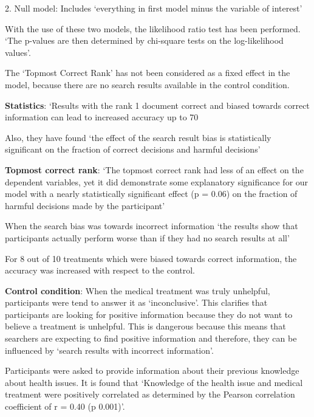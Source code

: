 \documentclass[]{article}
\begin{document}
2.	Null model: Includes ‘everything in first model minus the variable of interest’

With the use of these two models, the likelihood ratio test has been performed. ‘The p-values are then determined by chi-square tests on the log-likelihood values’.

The ‘Topmost Correct Rank’ has not been considered as a fixed effect in the model, because there are no search results available in the control condition. 

\textbf{Statistics}: ‘Results with the rank 1 document correct and biased towards correct information can lead to increased accuracy up to 70%

Also, they have found ‘the effect of the search result bias is statistically significant on the fraction of correct decisions and harmful decisions’

\textbf{Topmost correct rank}: ‘The topmost correct rank had less of an effect on the dependent variables, yet it did demonstrate some explanatory significance for our model with a nearly statistically significant effect (p = 0.06) on the fraction of harmful decisions made by the participant’

When the search bias was towards incorrect information ‘the results show that participants actually perform worse than if they had no search results at all’

For 8 out of 10 treatments which were biased towards correct information, the accuracy was increased with respect to the control. 

\textbf{Control condition}: When the medical treatment was truly unhelpful, participants were tend to answer it as ‘inconclusive’. This clarifies that participants are looking for positive information because they do not want to believe a treatment is unhelpful. This is dangerous because this means that searchers are expecting to find positive information and therefore, they can be influenced by ‘search results with incorrect information’. 

Participants were asked to provide information about their previous knowledge about health issues. It is found that ‘Knowledge of the health issue and medical treatment were positively correlated as determined by the Pearson correlation coefficient of r = 0.40 (p 0.001)’.
 
\end{document}
